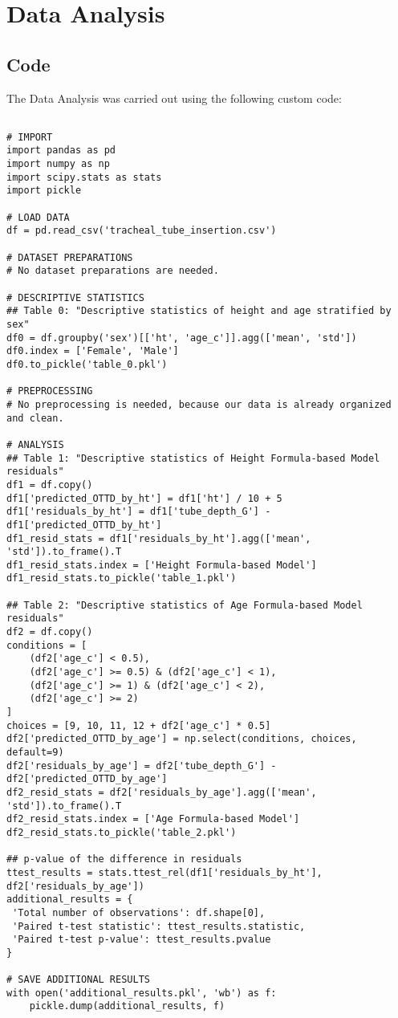 \documentclass[11pt]{article}
\begin{document}
\section{Data Analysis}
\subsection{{Code}}
The Data Analysis was carried out using the following custom code:

\begin{verbatim}

# IMPORT
import pandas as pd
import numpy as np
import scipy.stats as stats
import pickle

# LOAD DATA
df = pd.read_csv('tracheal_tube_insertion.csv')

# DATASET PREPARATIONS
# No dataset preparations are needed.

# DESCRIPTIVE STATISTICS
## Table 0: "Descriptive statistics of height and age stratified by sex"
df0 = df.groupby('sex')[['ht', 'age_c']].agg(['mean', 'std'])
df0.index = ['Female', 'Male']
df0.to_pickle('table_0.pkl')

# PREPROCESSING 
# No preprocessing is needed, because our data is already organized and clean.

# ANALYSIS
## Table 1: "Descriptive statistics of Height Formula-based Model residuals"
df1 = df.copy()
df1['predicted_OTTD_by_ht'] = df1['ht'] / 10 + 5
df1['residuals_by_ht'] = df1['tube_depth_G'] - df1['predicted_OTTD_by_ht']
df1_resid_stats = df1['residuals_by_ht'].agg(['mean', 'std']).to_frame().T
df1_resid_stats.index = ['Height Formula-based Model']
df1_resid_stats.to_pickle('table_1.pkl')

## Table 2: "Descriptive statistics of Age Formula-based Model residuals"
df2 = df.copy()
conditions = [
    (df2['age_c'] < 0.5),
    (df2['age_c'] >= 0.5) & (df2['age_c'] < 1),
    (df2['age_c'] >= 1) & (df2['age_c'] < 2),
    (df2['age_c'] >= 2)
]
choices = [9, 10, 11, 12 + df2['age_c'] * 0.5]
df2['predicted_OTTD_by_age'] = np.select(conditions, choices, default=9)
df2['residuals_by_age'] = df2['tube_depth_G'] - df2['predicted_OTTD_by_age']
df2_resid_stats = df2['residuals_by_age'].agg(['mean', 'std']).to_frame().T
df2_resid_stats.index = ['Age Formula-based Model']
df2_resid_stats.to_pickle('table_2.pkl')

## p-value of the difference in residuals
ttest_results = stats.ttest_rel(df1['residuals_by_ht'], df2['residuals_by_age'])
additional_results = {
 'Total number of observations': df.shape[0], 
 'Paired t-test statistic': ttest_results.statistic,
 'Paired t-test p-value': ttest_results.pvalue
}

# SAVE ADDITIONAL RESULTS
with open('additional_results.pkl', 'wb') as f:
    pickle.dump(additional_results, f)

\end{verbatim}
\end{document}
